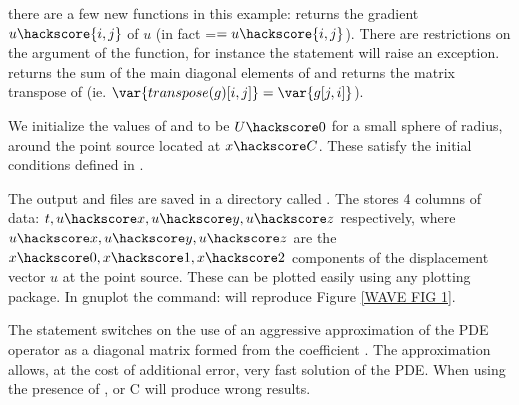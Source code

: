 there are a few new \escript functions in this example: 
 returns the gradient $u\hackscore{i,j}$ of $u$ (in fact =$=u\hackscore{i,j}$).
There are restrictions on the argument of the  function, for instance
the statement  will raise an exception.
 returns the sum of the main diagonal elements  of  
and  returns the matrix transpose of  (ie. $\var{transpose(g)[i,j]}=\var{g[j,i]}$). 

We initialize the values of  and  to be $U\hackscore 0$ for a small 
sphere of radius,  around the point source located at $x\hackscore C$.
These satisfy the initial conditions defined in .

The output  and  files are saved in a directory called .
The  stores 4 columns of data: $t,u\hackscore x,u\hackscore y,u\hackscore z$ 
respectively, where $u\hackscore x,u\hackscore y,u\hackscore z$ are the $x\hackscore 0,x\hackscore 1,x\hackscore 2$ components of 
the displacement vector $u$ at the point source. These can be
plotted easily using any plotting package. In gnuplot the command:
 will reproduce Figure \ref{WAVE FIG 1}.

The statement 
switches on the use of an aggressive approximation of the PDE operator as a diagonal matrix
formed from the coefficient .
The approximation allows, at the cost of 
additional error, very fast 
solution of the PDE. When using  the presence of ,  or \var
{C} will produce wrong results.


